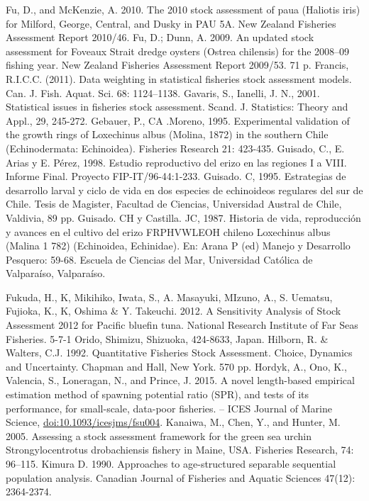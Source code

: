 \documentclass[
]{article}
\begin{document}
Fu, D., and McKenzie, A. 2010. The 2010 stock assessment of paua
(Haliotis iris) for Milford, George, Central, and Dusky in PAU 5A. New
Zealand Fisheries Assessment Report 2010/46. Fu, D.; Dunn, A. 2009. An
updated stock assessment for Foveaux Strait dredge oysters (Ostrea
chilensis) for the 2008--09 fishing year. New Zealand Fisheries
Assessment Report 2009/53. 71 p. Francis, R.I.C.C. (2011). Data
weighting in statistical fisheries stock assessment models. Can. J.
Fish. Aquat. Sci. 68: 1124--1138. Gavaris, S., Ianelli, J. N., 2001.
Statistical issues in fisheries stock assessment. Scand. J. Statistics:
Theory and Appl., 29, 245-272. Gebauer, P., CA .Moreno, 1995.
Experimental validation of the growth rings of Loxechinus albus (Molina,
1872) in the southern Chile (Echinodermata: Echinoidea). Fisheries
Research 21: 423-435. Guisado, C., E. Arias y E. Pérez, 1998. Estudio
reproductivo del erizo en las regiones I a VIII. Informe Final. Proyecto
FIP-IT/96-44:1-233. Guisado. C, 1995. Estrategias de desarrollo larval y
ciclo de vida en dos especies de echinoideos regulares del sur de Chile.
Tesis de Magister, Facultad de Ciencias, Universidad Austral de Chile,
Valdivia, 89 pp. Guisado. CH y Castilla. JC, 1987. Historia de vida,
reproducción y avances en el cultivo del erizo FRPHVWLEOH chileno
Loxechinus albus (Malina 1 782) (Echinoidea, Echinidae). En: Arana P
(ed) Manejo y Desarrollo Pesquero: 59-68. Escuela de Ciencias del Mar,
Universidad Católica de Valparaíso, Valparaíso.

Fukuda, H., K, Mikihiko, Iwata, S., A. Masayuki, MIzuno, A., S. Uematsu,
Fujioka, K., K, Oshima \& Y. Takeuchi. 2012. A Sensitivity Analysis of
Stock Assessment 2012 for Pacific bluefin tuna. National Research
Institute of Far Seas Fisheries. 5-7-1 Orido, Shimizu, Shizuoka,
424-8633, Japan. Hilborn, R. \& Walters, C.J. 1992. Quantitative
Fisheries Stock Assessment. Choice, Dynamics and Uncertainty. Chapman
and Hall, New York. 570 pp. Hordyk, A., Ono, K., Valencia, S.,
Loneragan, N., and Prince, J. 2015. A novel length-based empirical
estimation method of spawning potential ratio (SPR), and tests of its
performance, for small-scale, data-poor fisheries. -- ICES Journal of
Marine Science, \url{doi:10.1093/icesjms/fsu004}. Kanaiwa, M., Chen, Y.,
and Hunter, M. 2005. Assessing a stock assessment framework for the
green sea urchin Strongylocentrotus drobachiensis fishery in Maine, USA.
Fisheries Research, 74: 96--115. Kimura D. 1990. Approaches to
age-structured separable sequential population analysis. Canadian
Journal of Fisheries and Aquatic Sciences 47(12): 2364-2374.
\end{document}
